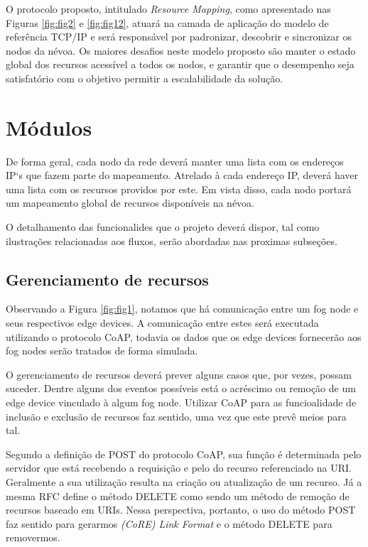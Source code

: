 O protocolo proposto, intitulado \textit{Resource Mapping}, como apresentado nas Figuras \ref{fig:fig2} e \ref{fig:fig12}, atuará na camada de aplicação do modelo de referência TCP/IP \cite{tanenbaum2011redes} e será responsável por padronizar, descobrir e sincronizar os nodos da névoa.
Os maiores desafios neste modelo proposto são manter o estado global dos recursos acessível a todos os nodos, e garantir que o desempenho seja satisfatório com o objetivo permitir a escalabilidade da solução.


\section{Módulos}

De forma geral, cada nodo da rede deverá manter uma lista com os endereços IP`s que fazem parte do mapeamento.
Atrelado à cada endereço IP, deverá haver uma lista com os recursos providos por este.
Em vista disso, cada nodo portará um mapeamento global de recursos disponíveis na névoa.

O detalhamento das funcionalides que o projeto deverá dispor, tal como ilustrações relacionadas aos fluxos, serão abordadas nas proximas subseções.

\subsection{Gerenciamento de recursos}

Observando a Figura \ref{fig:fig1}, notamos que há comunicação entre um fog node e seus respectivos edge devices.
A comunicação entre estes será executada utilizando o protocolo CoAP, todavia os dados que os edge devices fornecerão aos fog nodes serão tratados de forma simulada.

O gerenciamento de recursos deverá prever alguns casos que, por vezes, possam suceder. Dentre alguns dos eventos possíveis está
o acréscimo ou remoção de um edge device vinculado à algum fog node.
Utilizar CoAP para as funcioalidade de inclusão e exclusão de recursos faz sentido, uma vez que este prevê meios para tal.

Segundo a definição de POST do protocolo CoAP, sua função é determinada pelo servidor que está recebendo a requisição e pelo do recurso referenciado na URI.
Geralmente a sua utilização resulta na criação ou atualização de um recurso\cite{rfc7252}.
Já a mesma RFC define o método DELETE como sendo um método de remoção de recursos baseado em URIs\cite{rfc7252}.
Nessa perspectiva, portanto, o uso do método POST faz sentido para gerarmos \textit{(CoRE) Link Format} e o método DELETE para removermos.


